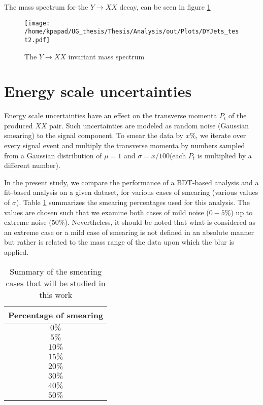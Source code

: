 The mass spectrum for the \(Y \rightarrow XX\) decay, can be seen in figure \ref{fig:diX}

\begin{figure}[h]
\centering
\texttt{[image: /home/kpapad/UG\_thesis/Thesis/Analysis/out/Plots/DYJets\_test2.pdf]}
\caption{The $Y\rightarrow XX$ invariant mass spectrum}
\label{fig:diX}
\end{figure}

\section{Energy scale uncertainties}
\label{sec:org37b0e2d}
\label{sec:Energy_scale_uncertainties}
Energy scale uncertainties have an effect on the transverse momenta \(P_t\) of the produced \(XX\) pair. Such uncertainties are modeled as random noise (Gaussian smearing) to the signal component. To smear the data by \(x\%\), we iterate over every signal event and multiply the transverse momenta by numbers sampled from a Gaussian distribution of \(\mu = 1\) and \(\sigma = x/100\)(each \(P_t\) is multiplied by a different number).

In the present study, we compare the performance of a BDT-based analysis and a fit-based analysis on a given dataset, for various cases of smearing (various values of \(\sigma\)). Table \ref{table:Smearings} summarizes the smearing percentages used for this analysis. The values are chosen such that we examine both cases of mild noise (\(0-5\%\)) up to extreme noise (\(50\%\)). Nevertheless, it should be noted that what is considered as an extreme case or a mild case of smearing is not defined in an absolute manner but rather is related to the mass range of the data upon which the blur is applied.

\begin{table}[h!]
\centering
\begin{tabular}{ |c|  }
 \hline
Percentage of smearing \\
 \hline
$0\%$\\
$5\%$\\
$10\%$\\
$15\%$\\
$20\%$\\
$30\%$\\
$40\%$\\
$50\%$\\
\hline
\end{tabular}
\caption{Summary of the smearing cases that will be studied in this work }
\label{table:Smearings}
\end{table}

